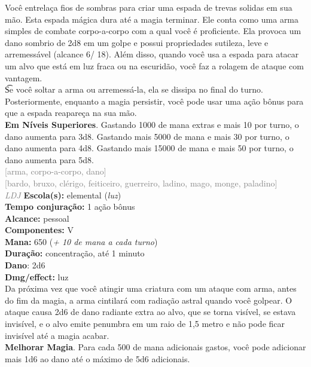 \documentclass{RPG_Adventure}[2021/10/20]
\begin{document}
{\normalsize Você entrelaça fios de sombras para criar uma espada de trevas solidas em sua mão. Esta espada mágica dura até a magia terminar. Ele conta como uma arma simples de combate corpo-a-corpo com a qual você é proficiente. Ela provoca um dano sombrio de 2d8 em um golpe e possui propriedades sutileza, leve e arremessável (alcance 6/ 18). Além disso, quando você usa a espada para atacar um alvo que está em luz fraca ou na escuridão, você faz a rolagem de ataque com vantagem.\\\t Se você soltar a arma ou arremessá-la, ela se dissipa no final do turno. Posteriormente, enquanto a magia persistir, você pode usar uma ação bônus para que a espada reapareça na sua mão.\\\t \textbf{Em Níveis Superiores}. Gastando 1000 de mana extras e mais 10 por turno, o dano aumenta para 3d8. Gastando mais 5000 de mana e mais 30 por turno, o dano aumenta para 4d8. Gastando mais 15000 de mana e mais 50 por turno, o dano aumenta para 5d8.\\}
{\scriptsize \textcolor{gray}{[arma, corpo-a-corpo, dano]\\}}
{\scriptsize \textcolor{gray}{[bardo, bruxo, clérigo, feiticeiro, guerreiro, ladino, mago, monge, paladino]\\}}
{\tiny \textcolor{gray}{\textit{LDJ}}}
{\small \t \textbf{Escola(s):} elemental (\textit{luz})\\\t \textbf{Tempo conjuração:} 1 ação bônus\\\t \textbf{Alcance:} pessoal\\\t \textbf{Componentes:} V\\\t \textbf{Mana:} 650 (\textit{+ 10 de mana a cada turno})\\\t \textbf{Duração:} concentração, até 1 minuto\\\t \textbf{Dano}: 2d6\\\t \textbf{Dmg/effect:} luz\\}
{\normalsize Da próxima vez que você atingir uma criatura com um ataque com arma, antes do fim da magia, a arma cintilará com radiação astral quando você golpear. O ataque causa 2d6 de dano radiante extra ao alvo, que se torna visível, se estava invisível, e o alvo emite penumbra em um raio de 1,5 metro e não pode ficar invisível até a magia acabar.\\\t \textbf{Melhorar Magia}. Para cada 500 de mana adicionais gastos, você pode adicionar mais 1d6 ao dano até o máximo de 5d6 adicionais.\\}
\end{document}

